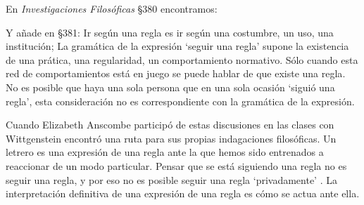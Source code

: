 En \emph{Investigaciones Filosóficas} \S380 encontramos:

Y añade en \S381:  Ir según una regla es
ir según una costumbre, un uso, una institución;  La gramática de la
expresión `seguir una regla' supone la existencia de una prática, una
regularidad, un comportamiento normativo. Sólo cuando esta red de
comportamientos está en juego se puede hablar de que existe una
regla\autocite[cf.~][p.~14]{bakerhacker2009understanding}. No es posible que
haya una sola persona que en una sola ocasión `siguió una regla', esta
consideración no es correspondiente con la gramática de la
expresión\autocite[cf.~][p.~87 \S1 199]{wittgenstein1953phiinv}.

Cuando Elizabeth Anscombe participó de estas discusiones en las clases con
Wittgenstein encontró una ruta para sus propias indagaciones filosóficas.
 Un letrero es una
expresión de una regla ante la que hemos sido entrenados a reaccionar de un modo
particular. Pensar que se está siguiendo una regla no es seguir una regla, y por
eso no es posible seguir una regla `privadamente' \autocite[cf.~][p.87 /S1
202]{wittgenstein1953phiinv}. La interpretación definitiva de una expresión de
una regla es cómo se actua ante ella.

